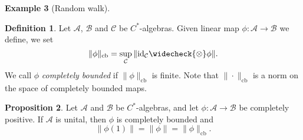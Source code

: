 \documentclass[10pt,a4paper]{amsart}
\theoremstyle{definition}
\newtheorem{definition}{Definition}[section]
\theoremstyle{definition}
\newtheorem{example}[definition]{Example}
\theoremstyle{definition}
\theoremstyle{definition}
\newtheorem{proposition}[definition]{Proposition}
\theoremstyle{definition}
\theoremstyle{definition}
\newtheorem{theorem}[definition]{Theorem}
\begin{document}
\begin{example}[Random walk]

  

\begin{definition} \cite[Introduction  p.4]{pisierTensorProductsCAlgebras2020} \label{def:cb_norm}
Let $\mathcal{A}$, $\mathcal{B}$ and $\mathcal{C}$ be $C^*$-algebras. Given  linear map $\phi: \mathcal{A} \to \mathcal{B}$ we define, we set
\[
\|\phi\|_{\text{cb}} = \sup_{\mathcal{C}} \|\id_{\mathcal{C}} \widecheck{\otimes} \phi\|.
\]
We call $\phi$ \emph{completely bounded} if $\|\phi\|_{\text{cb}} $ is finite.
Note that $\|\cdot\|_{\text{cb}}$ is a norm on the space of completely bounded maps. 

\end{definition}


\begin{proposition} \label{prop:cp_cb} \cite[Exercise 11.5 (iii)]{pisierIntroductionOperatorSpace2003}
  Let $\mathcal{A}$ and $\mathcal{B}$ be $C^*$-algebras, and let $\phi: \mathcal{A} \to \mathcal{B}$ be completely positive. If $\mathcal{A}$ is unital, then $\phi$ is completely bounded and 
\[
\|\phi(1)\| = \|\phi\| = \|\phi\|_{\text{cb}}.
\]
\end{proposition}

\begin{comment}
\begin{theorem} \label{thm:tensor_cb} \cite[Proposition 12.3]{paulsenCompletelyBoundedMaps2003}
  Let $\mathcal{A}_i$ and $\mathcal{B}_i$ be unital $C^*$-algebras, let $\mathcal{S}_i \subseteq \mathcal{A}_i$ be subspaces, 
and let $L_i: \mathcal{S}_i \to \mathcal{B}_i$ be completely bounded, $i = 1,2$. Then the linear map $L_1 \widecheck{\otimes} 
L_2: \mathcal{S}_1 \widecheck{\otimes} \mathcal{S}_2 \to \mathcal{B}_1 \widecheck{\otimes} \mathcal{B}_2$, given by $(L_1 \widecheck{\otimes} L_2)(a_1 \otimes a_2) = L_1(a_1) \otimes L_2(a_2)$, 
defines a completely bounded map $L_1 \widecheck{\otimes} L_2: \mathcal{S}_1 \widecheck{\otimes} \mathcal{S}_2 \to \mathcal{B}_1 \widecheck{\otimes} \mathcal{B}_2$, with
\[
\|L_1 \widecheck{\otimes}L_2\|_{\text{cb}} = \|L_1\|_{\text{cb}} \|L_2\|_{\text{cb}}.
\]
\end{theorem}



\end{comment}
\end{example}
\end{document}
